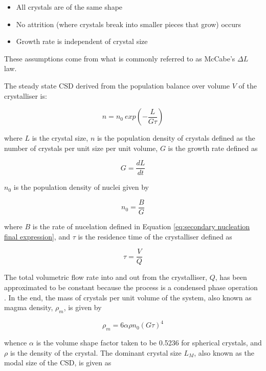 \begin{itemize}
    \item All crystals are of the same shape
    \item No attrition (where crystals break into smaller pieces that grow) occurs
    \item Growth rate is independent of crystal size
\end{itemize}

\noindent These assumptions come from what is commonly referred to as McCabe's $\Delta L$ law. 

The steady state CSD derived from the population balance over volume $V$ of the crystalliser is:

\begin{equation}
    n = n_0 ~exp(-\frac{L}{G\tau})
\end{equation}

\noindent where $L$ is the crystal size, $n$ is the population density of crystals defined as the number of crystals per unit size per unit volume, $G$ is the growth rate defined as 

\begin{equation}
    G = \frac{dL}{dt}
\end{equation}

\noindent $n_0$ is the population density of nuclei given by 

\begin{equation}
    n_0 = \frac{B}{G}
\end{equation}

\noindent where $B$ is the rate of nucelation defined in Equation \ref{eq:secondary nucleation final expression}, and $\tau$ is the residence time of the crystalliser defined as 

\begin{equation}
    \tau = \frac{V}{Q}
\end{equation}

\noindent The total volumetric flow rate into and out from the crystalliser, $Q$, has been approximated to be constant because the process is a condensed phase operation \cite{levenspiel_chemical_1999}. In the end, the mass of crystals per unit volume of the system, also known as magma density, $\rho_m$, is given by

\begin{equation} \label{eq:magma density}
    \rho_m = 6 \alpha \rho n_0 (G \tau)^4
\end{equation}

\noindent whence $\alpha$ is the volume shape factor taken to be 0.5236 for spherical crystals, and $\rho$ is the density of the crystal. The dominant crystal size $L_M$, also known as the modal size of the CSD, is given as 

